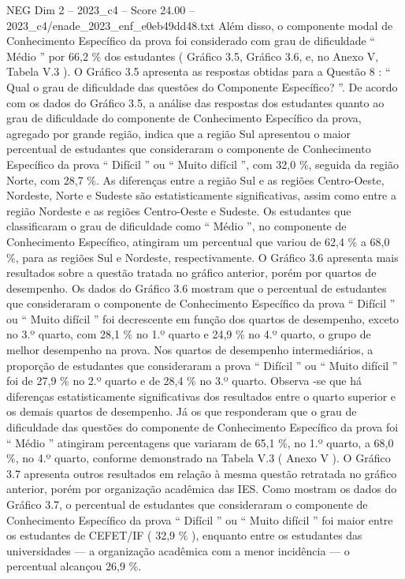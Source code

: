 \begin{textsample}{NEG Dim 2 – 2023\_c4 – Score 24.00 – 2023\_c4/enade\_2023\_enf\_e0eb49dd48.txt}
Além disso, o componente modal de Conhecimento Específico da prova foi considerado com grau de dificuldade “ Médio ” por 66,2 \% dos estudantes ( Gráfico 3.5, Gráfico 3.6, e, no Anexo V, Tabela V.3 ).
O Gráfico 3.5 apresenta as respostas obtidas para a Questão 8 : “ Qual o grau de dificuldade das questões do Componente Específico? ”.
De acordo com os dados do Gráfico 3.5, a análise das respostas dos estudantes quanto ao grau de dificuldade do componente de Conhecimento Específico da prova, agregado por grande região, indica que a região Sul apresentou o maior percentual de estudantes que consideraram o componente de Conhecimento Específico da prova “ Difícil ” ou “ Muito difícil ”, com 32,0 \%, seguida da região Norte, com 28,7 \%.
As diferenças entre a região Sul e as regiões Centro-Oeste, Nordeste, Norte e Sudeste são estatisticamente significativas, assim como entre a região Nordeste e as regiões Centro-Oeste e Sudeste.
Os estudantes que classificaram o grau de dificuldade como “ Médio ”, no componente de Conhecimento Específico, atingiram um percentual que variou de 62,4 \% a 68,0 \%, para as regiões Sul e Nordeste, respectivamente.
O Gráfico 3.6 apresenta mais resultados sobre a questão tratada no gráfico anterior, porém por quartos de desempenho.
Os dados do Gráfico 3.6 mostram que o percentual de estudantes que consideraram o componente de Conhecimento Específico da prova “ Difícil ” ou “ Muito difícil ” foi decrescente em função dos quartos de desempenho, exceto no 3.º quarto, com 28,1 \% no 1.º quarto e 24,9 \% no 4.º quarto, o grupo de melhor desempenho na prova.
Nos quartos de desempenho intermediários, a proporção de estudantes que consideraram a prova “ Difícil ” ou “ Muito difícil ” foi de 27,9 \% no 2.º quarto e de 28,4 \% no 3.º quarto.
Observa -se que há diferenças estatisticamente significativas dos resultados entre o quarto superior e os demais quartos de desempenho.
Já os que responderam que o grau de dificuldade das questões do componente de Conhecimento Específico da prova foi “ Médio ” atingiram percentagens que variaram de 65,1 \%, no 1.º quarto, a 68,0 \%, no 4.º quarto, conforme demonstrado na Tabela V.3 ( Anexo V ).
O Gráfico 3.7 apresenta outros resultados em relação à mesma questão retratada no gráfico anterior, porém por organização acadêmica das IES.
Como mostram os dados do Gráfico 3.7, o percentual de estudantes que consideraram o componente de Conhecimento Específico da prova “ Difícil ” ou “ Muito difícil ” foi maior entre os estudantes de CEFET/IF ( 32,9 \% ), enquanto entre os estudantes das universidades — a organização acadêmica com a menor incidência — o percentual alcançou 26,9 \%.

\end{textsample}
